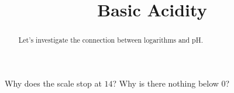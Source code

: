 \documentclass{ximera}
\title{Basic Acidity}
\begin{document}
\begin{abstract}
Let's investigate the connection between logarithms and pH.
\end{abstract}
\maketitle





\begin{question}
Why does the scale stop at $14$? Why is there nothing below $0$?
\end{question}
\end{document}
